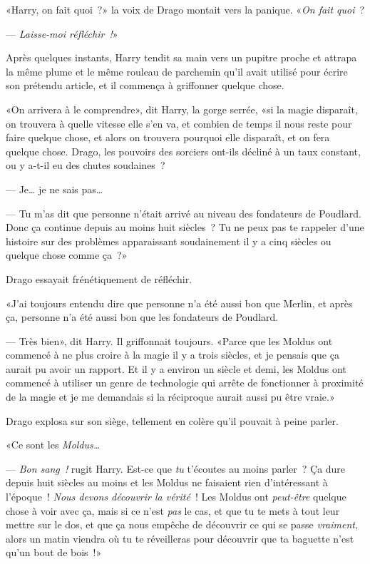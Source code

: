 «Harry, on fait quoi~?» la voix de Drago montait vers la panique. «\emph{On fait quoi}~?

--- \emph{Laisse-moi réfléchir~!}»

Après quelques instants, Harry tendit sa main vers un pupitre proche et attrapa la même plume et le même rouleau de parchemin qu'il avait utilisé pour écrire son prétendu article, et il commença à griffonner quelque chose.

«On arrivera à le comprendre», dit Harry, la gorge serrée, «si la magie disparaît, on trouvera à quelle vitesse elle s'en va, et combien de temps il nous reste pour faire quelque chose, et alors on trouvera pourquoi elle disparaît, et on fera quelque chose. Drago, les pouvoirs des sorciers ont-ils décliné à un taux constant, ou y a-t-il eu des chutes soudaines~?

--- Je… je ne sais pas…

--- Tu m'as dit que personne n'était arrivé au niveau des fondateurs de Poudlard. Donc ça continue depuis au moins huit siècles~? Tu ne peux pas te rappeler d'une histoire sur des problèmes apparaissant soudainement il y a cinq siècles ou quelque chose comme ça~?»

Drago essayait frénétiquement de réfléchir.

«J'ai toujours entendu dire que personne n'a été aussi bon que Merlin, et après ça, personne n'a été aussi bon que les fondateurs de Poudlard.

--- Très bien», dit Harry. Il griffonnait toujours. «Parce que les Moldus ont commencé à ne plus croire à la magie il y a trois siècles, et je pensais que ça aurait pu avoir un rapport. Et il y a environ un siècle et demi, les Moldus ont commencé à utiliser un genre de technologie qui arrête de fonctionner à proximité de la magie et je me demandais si la réciproque aurait aussi pu être vraie.»

Drago explosa sur son siège, tellement en colère qu'il pouvait à peine parler.

«Ce sont les \emph{Moldus…}

--- \emph{Bon sang~!} rugit Harry. Est-ce que \emph{tu} t'écoutes au moins parler~? Ça dure depuis huit siècles au moins et les Moldus ne faisaient rien d'intéressant à l'époque~! \emph{Nous devons découvrir la vérité}~! Les Moldus ont \emph{peut-être} quelque chose à voir avec ça, mais si ce n'est \emph{pas} le cas, et que tu te mets à tout leur mettre sur le dos, et que ça nous empêche de découvrir ce qui se passe \emph{vraiment}, alors un matin viendra où tu te réveilleras pour découvrir que ta baguette n'est qu'un bout de bois~!»

